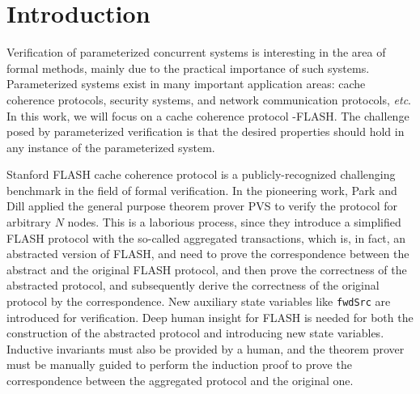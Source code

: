 \documentclass{llncs}
\newcommand\JP[1]{\textcolor{magenta}{JP: #1}}
\begin{document}
\section{Introduction}\label{sec:introduction}
Verification of parameterized concurrent systems is interesting in
the area of formal methods, mainly due to the practical importance
of such systems. Parameterized systems exist in many important
application areas: cache coherence protocols, security systems, and
network communication protocols, \emph{etc}. In this work, we will
focus on a cache coherence protocol -FLASH. The challenge posed by
parameterized verification is that the desired properties should
hold in any instance of the parameterized system. %

Stanford FLASH cache coherence protocol \cite{FLASHCache} is a publicly-recognized challenging benchmark in the field of formal
 verification. In the pioneering work,
Park and Dill applied the general purpose theorem prover PVS\cite{cade92-pvs}
to   verify the protocol for arbitrary $N$ nodes\cite{Park1996a}. This is a laborious process, since they introduce a simplified  FLASH protocol with the so-called aggregated transactions, which
is, in fact,  an abstracted version of FLASH, and  need to prove
the correspondence between the abstract and the original FLASH
protocol, and then prove the correctness of the abstracted protocol, and subsequently derive the correctness of  the
original protocol by the correspondence. New   auxiliary state variables
like {\tt fwdSrc} are   introduced  for verification. Deep human insight for FLASH is needed for both the construction of the abstracted protocol  and  introducing new state variables. Inductive invariants must also be
 provided by a human, and the theorem prover must be manually guided to perform the induction proof to prove the correspondence between the aggregated protocol  and the original one. %
\end{document}
